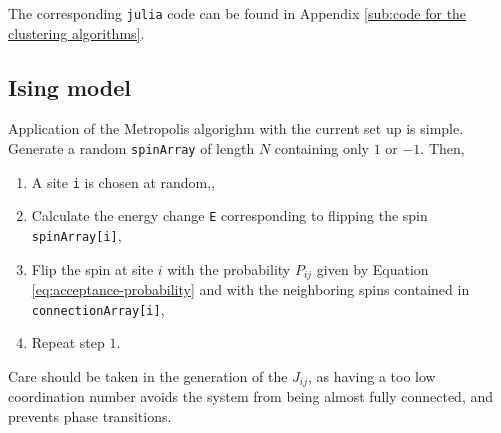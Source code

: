 The corresponding \texttt{julia} code can be found in Appendix \ref{sub:code for the clustering algorithms}.

% 
%
%

\subsection{Ising model}%
\label{sub:Ising model}

Application of the Metropolis algorighm with the current set up is simple. Generate a random \texttt{spinArray} of length $N$ containing only  $1$ or  $-1$. Then,
\begin{enumerate}
	\item A site \texttt{i} is chosen at random,,
	\item Calculate the energy change \texttt{E} corresponding to flipping the spin \texttt{spinArray[i]},
	\item Flip the spin at site $i$ with the probability $P_{ij}$ given by Equation \eqref{eq:acceptance-probability} and with the neighboring spins contained in \texttt{connectionArray[i]},
	\item Repeat step $1$.
\end{enumerate}

Care should be taken in the generation of the $J_{ij}$, as having a too low coordination number avoids the system from being almost fully connected, and prevents phase transitions.
